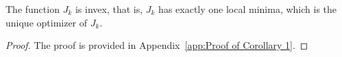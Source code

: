 

\begin{corollary}\label{cor: invex function}
     The function $J_k$ is invex, that is, $J_k$ has exactly one local minima, which is the unique optimizer of $J_k$.
\end{corollary}
\begin{proof}
    The proof is provided in Appendix~\ref{app:Proof of Corollary 1}.
\end{proof}



